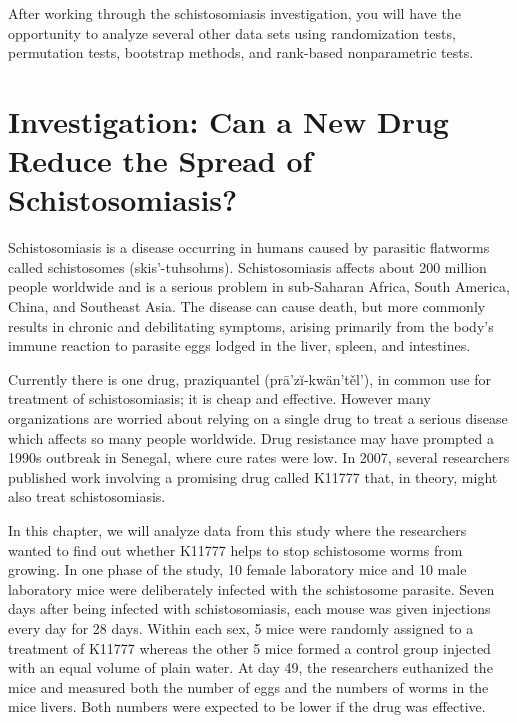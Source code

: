 \documentclass[
]{report}
\begin{document}
After working through the schistosomiasis investigation, you will have the opportunity to analyze several other data sets using randomization tests, permutation tests, bootstrap methods, and rank-based nonparametric tests.

\newpage

\hypertarget{investigation-can-a-new-drug-reduce-the-spread-of-schistosomiasis}{%
\section{\texorpdfstring{\textbf{Investigation: Can a New Drug Reduce the Spread of Schistosomiasis?}}{Investigation: Can a New Drug Reduce the Spread of Schistosomiasis?}}\label{investigation-can-a-new-drug-reduce-the-spread-of-schistosomiasis}}

Schistosomiasis is a disease occurring in humans caused by parasitic flatworms called schistosomes (skis'-tuhsohms). Schistosomiasis affects about 200 million people worldwide and is a serious problem in sub-Saharan Africa, South America, China, and Southeast Asia. The disease can cause death, but more commonly results in chronic and debilitating symptoms, arising primarily from the body's immune reaction to parasite eggs lodged in the liver, spleen, and intestines.

Currently there is one drug, praziquantel (prā'zĭ-kwän'těl'), in common use for treatment of schistosomiasis; it is cheap and effective. However many organizations are worried about relying on a single drug to treat a serious disease which affects so many people worldwide. Drug resistance may have prompted a 1990s outbreak in Senegal, where cure rates were low. In 2007, several researchers published work involving a promising drug called K11777 that, in theory, might also treat schistosomiasis.

In this chapter, we will analyze data from this study where the researchers wanted to find out whether K11777 helps to stop schistosome worms from growing. In one phase of the study, 10 female laboratory mice and 10 male laboratory mice were deliberately infected with the schistosome parasite. Seven days after being infected with schistosomiasis, each mouse was given injections every day for 28 days. Within each sex, 5 mice were randomly assigned to a treatment of K11777 whereas the other 5 mice formed a control group injected with an equal volume of plain water. At day 49, the researchers euthanized the mice and measured both the number of eggs and the numbers of worms in the mice livers. Both numbers were expected to be lower if the drug was effective.
\end{document}
